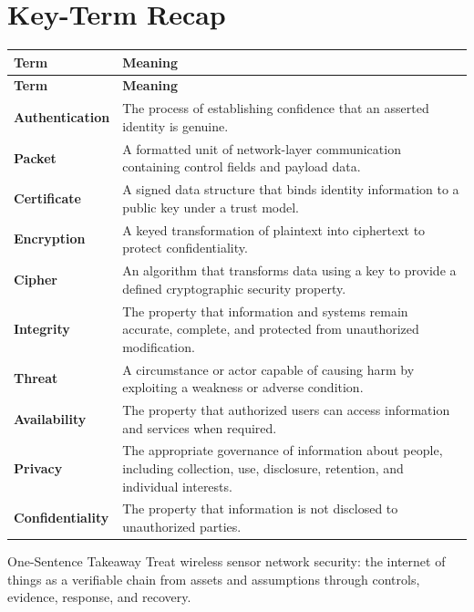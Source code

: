 \documentclass[11pt,letterpaper]{article}
\begin{document}
\section*{Key-Term Recap}
\begin{longtable}{>{\raggedright\arraybackslash}p{}>{\raggedright\arraybackslash}p{}}
\toprule\rowcolor{Navy}\color{white}\textbf{Term} & \color{white}\textbf{Meaning}\\\midrule
\endfirsthead
\toprule\rowcolor{Navy}\color{white}\textbf{Term} & \color{white}\textbf{Meaning}\\\midrule
\endhead
\textbf{Authentication} & The process of establishing confidence that an asserted identity is genuine. \\\midrule
\textbf{Packet} & A formatted unit of network-layer communication containing control fields and payload data. \\\midrule
\textbf{Certificate} & A signed data structure that binds identity information to a public key under a trust model. \\\midrule
\textbf{Encryption} & A keyed transformation of plaintext into ciphertext to protect confidentiality. \\\midrule
\textbf{Cipher} & An algorithm that transforms data using a key to provide a defined cryptographic security property. \\\midrule
\textbf{Integrity} & The property that information and systems remain accurate, complete, and protected from unauthorized modification. \\\midrule
\textbf{Threat} & A circumstance or actor capable of causing harm by exploiting a weakness or adverse condition. \\\midrule
\textbf{Availability} & The property that authorized users can access information and services when required. \\\midrule
\textbf{Privacy} & The appropriate governance of information about people, including collection, use, disclosure, retention, and individual interests. \\\midrule
\textbf{Confidentiality} & The property that information is not disclosed to unauthorized parties. \\\midrule
\bottomrule
\end{longtable}
\begin{CornellExamBox}{One-Sentence Takeaway}
Treat wireless sensor network security: the internet of things as a verifiable chain from assets and assumptions through controls, evidence, response, and recovery.
\end{CornellExamBox}
\end{document}
